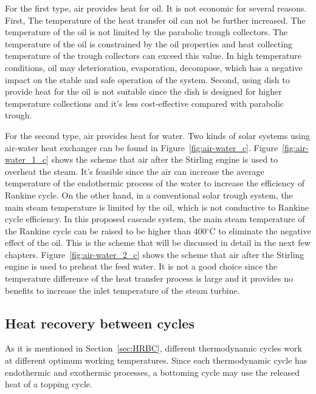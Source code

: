 For the first type, air provides heat for oil. It is not economic for several reasons. First, The temperature of the heat transfer oil can not be further increased. The temperature of the oil is not limited by the parabolic trough collectors. The temperature of the oil is constrained by the oil properties and heat collecting temperature of the trough collectors can exceed this value. In high temperature conditions, oil may deterioration, evaporation, decompose, which has a negative impact on the stable and safe operation of the system. Second, using dish to provide heat for the oil is not suitable since the dish is designed for higher temperature collections and it's less cost-effective compared with parabolic trough.

For the second type, air provides heat for water. Two kinds of solar systems using air-water heat exchanger can be found in Figure~\ref{fig:air-water_c}. Figure~\ref{fig:air-water_1_c} shows the scheme that air after the Stirling engine is used to overheat the steam. It's feasible since the air can increase the average temperature of the endothermic process of the water to increase the efficiency of Rankine cycle. On the other hand, in a conventional solar trough system, the main steam temperature is limited by the oil, which is not conductive to Rankine cycle efficiency. In this proposed cascade system, the main steam temperature of the Rankine cycle can be raised to be higher than 400$\mathrm{^\circ C}$ to eliminate the negative effect of the oil.
This is the scheme that will be discussed in detail in the next few chapters. Figure~\ref{fig:air-water_2_c} shows the scheme that air after the Stirling engine is used to preheat the feed water. It is not a good choice since the temperature difference of the heat transfer process is large and it provides no benefits to increase the inlet temperature of the steam turbine.
 
\subsection{Heat recovery between cycles}
As it is mentioned in Section~\ref{sec:HRBC}, different thermodynamic cycles work at different optimum working temperatures. Since each thermodynamic cycle has endothermic and exothermic processes, a bottoming cycle may use the released heat of a topping cycle.

